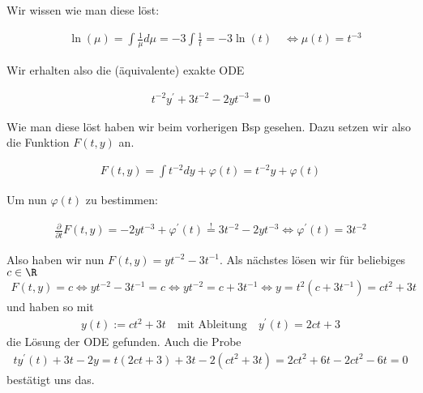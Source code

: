 \begin{solution}
Wir wissen wie man diese löst:

\begin{align*}
  &\ln(\mu) =\int \frac{1}{\mu} d\mu = -3 \int \frac{1}{t} = -3 \ln(t) \quad \iff \mu(t) = t^{-3}
\end{align*}

Wir erhalten also die (äquivalente) exakte ODE

\begin{align*}
  t^{-2}y^\prime + 3t^{-2} -2yt^{-3} = 0
\end{align*}

Wie man diese löst haben wir beim vorherigen Bsp gesehen. Dazu setzen wir also die
Funktion $F(t,y)$ an.

\begin{align*}
  F(t,y) = \int t^{-2} dy + \varphi(t) = t^{-2} y + \varphi(t)
\end{align*}

Um nun $\varphi(t)$ zu bestimmen:

\begin{align*}
  \frac{\partial}{\partial t} F(t,y) = -2yt^{-3} + \varphi^\prime (t)
  \stackrel{!}{=} 3t^{-2} -2yt^{-3} \iff
  \varphi^\prime (t) = 3t^{-2}
\end{align*}

Also haben wir nun $F(t,y) = yt^{-2} - 3t^{-1}$.
Als nächstes lösen wir für beliebiges $c \in \R$
  \begin{align*}
    F(t, y) = c \Leftrightarrow yt^{-2} - 3t^{-1} = c \Leftrightarrow yt^{-2} = c + 3t^{-1} \Leftrightarrow y = t^2 (c + 3t^{-1}) = ct^2 + 3t
  \end{align*}
  und haben so mit
  \begin{align*}
    y(t) := ct^2 + 3t \quad \textrm{mit Ableitung} \quad y^\prime(t) = 2ct + 3
  \end{align*}
  die Lösung der ODE gefunden. Auch die Probe
  \begin{align*}
    ty^\prime(t) + 3t - 2y = t (2ct + 3) + 3t - 2(ct^2 + 3t) = 2ct^2 + 6t - 2ct^2 -6t = 0
  \end{align*}
  bestätigt uns das.
\end{solution}
